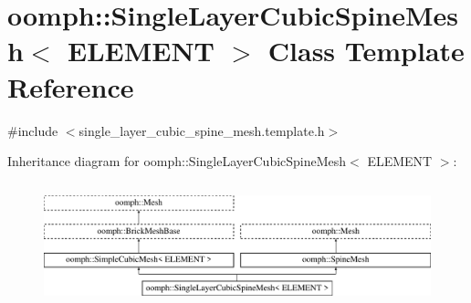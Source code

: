 \hypertarget{classoomph_1_1SingleLayerCubicSpineMesh}{}\section{oomph\+:\+:Single\+Layer\+Cubic\+Spine\+Mesh$<$ E\+L\+E\+M\+E\+NT $>$ Class Template Reference}
\label{classoomph_1_1SingleLayerCubicSpineMesh}


{\ttfamily \#include $<$single\+\_\+layer\+\_\+cubic\+\_\+spine\+\_\+mesh.\+template.\+h$>$}

Inheritance diagram for oomph\+:\+:Single\+Layer\+Cubic\+Spine\+Mesh$<$ E\+L\+E\+M\+E\+NT $>$\+:\begin{figure}[H]
\begin{center}
\leavevmode
\includegraphics[height=3.624595cm]{classoomph_1_1SingleLayerCubicSpineMesh}
\end{center}
\end{figure}
